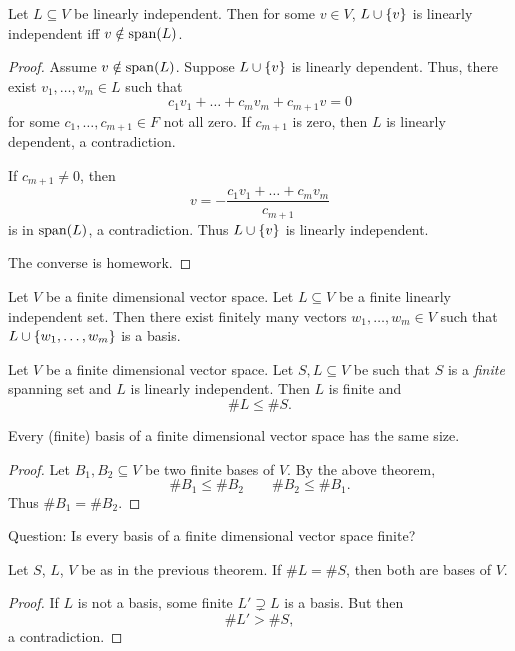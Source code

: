 \begin{prop}[]
    Let $L \subseteq V$ be linearly independent.
    Then for some $v \in V$, $L \cup \set{v}$ is linearly independent iff $v \notin \operatorname{span}(L)$.
\end{prop}
\begin{proof}
    Assume $v \notin \operatorname{span}(L)$.
    Suppose $L \cup \set{v}$ is linearly dependent. Thus, there exist $v_{1}, \dots, v_{m} \in L$ such that \[
        c_{1} v_{1} + \dots + c_{m} v_{m} + c_{m + 1} v = 0
    \] for some $c_{1}, \dots, c_{m + 1} \in F$ not all zero.
    If $c_{m+1}$ is zero, then $L$ is linearly dependent, a contradiction.

    If $c_{m+1} \neq 0$, then \[
        v = -\frac{c_{1} v_{1} + \dots + c_{m} v_{m}}{c_{m + 1}}
    \] is in $\operatorname{span}(L)$, a contradiction.
    Thus $L \cup \set{v}$ is linearly independent.

    The converse is \textcolor{red!70!black}{homework}.
\end{proof}
\begin{cor}[]
    Let $V$ be a finite dimensional vector space.
    Let $L \subseteq V$ be a finite linearly independent set.
    Then there exist finitely many vectors $w_{1}, \dots, w_{m} \in V$ such that $L \cup \set{w_{1}, \dots, w_{m}}$ is a basis.
\end{cor}

\begin{thm}[]
    Let $V$ be a finite dimensional vector space. Let $S, L \subseteq V$ be such that $S$ is a \emph{finite} spanning set and $L$ is linearly independent. Then $L$ is finite and \[
        \#L \leq \#S.
    \]
\end{thm}
\begin{cor}[]
    Every (finite) basis of a finite dimensional vector space has the same size.
\end{cor}
\begin{proof}
    Let $B_{1}, B_{2} \subseteq V$ be two finite bases of $V$.
    By the above theorem, \[
        \#B_{1} \leq \#B_{2} \qquad \#B_{2} \leq \#B_{1}.
    \] Thus $\#B_{1} = \#B_{2}$.
\end{proof}

\textcolor{orange!60!black}{Question: Is every basis of a finite dimensional vector space finite?}

\begin{cor}[]
    Let $S$, $L$, $V$ be as in the previous theorem.
    If $\#L = \#S$, then both are bases of $V$.
\end{cor}
\begin{proof}
    If $L$ is not a basis, some finite $L' \supsetneq L$ is a basis. But then \[
        \#L' > \#S,
    \] a contradiction.
\end{proof}
